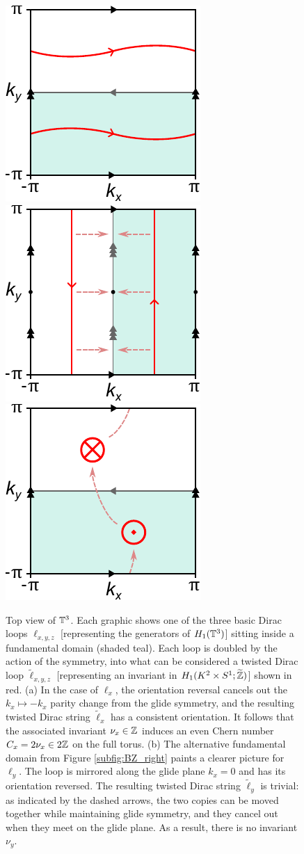 \begin{figure}[htb!]
	\centering
	 {\includegraphics[width=.3\textwidth]{Images/Z_invariant}}
	\hfil
	 {\includegraphics[width=.3\textwidth]{Images/0_invariant}}
	\hfil
	 {\includegraphics[width=.3\textwidth]{Images/Z2_invariant}}
	\caption{Top view of $\mathbb{T}^3$. Each graphic shows one of the three basic Dirac loops $\ell_{x,y,z}$ [representing the generators of $H_1(\mathbb{T}^3)$] sitting inside a fundamental domain (shaded teal). Each loop is doubled by the action of the symmetry, into what can be considered a twisted Dirac loop $\tilde{\ell}_{x,y,z}$ [representing an invariant in $H_1(K^2\times S^1;\widetilde{\mathbb{Z}})$] shown in red. (a) In the case of $\ell_x$, the orientation reversal cancels out the $k_x \mapsto -k_x$ parity change from the glide symmetry, and the resulting twisted Dirac string $\tilde{\ell}_x$ has a consistent orientation. It follows that the associated invariant $\nu_x\in\mathbb{Z}$ induces an even Chern number $C_x = 2\nu_x\in 2\mathbb{Z}$ on the full torus.
		(b) The alternative fundamental domain from Figure \ref{subfig:BZ_right} paints a clearer picture for $\ell_y$. The loop is mirrored along the glide plane $k_x=0$ and has its orientation reversed. The resulting twisted Dirac string $\tilde{\ell}_y$ is trivial: as indicated by the dashed arrows, the two copies can be moved together while maintaining glide symmetry, and they cancel out when they meet on the glide plane. As a result, there is no invariant $\nu_y$.
}
\end{figure}
